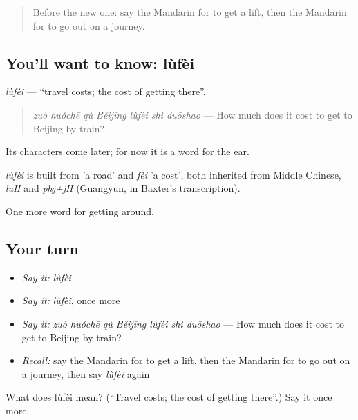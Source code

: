 \label{lesson:ZH-C429-lufei}



\begin{quote}
Before the new one: say the Mandarin for to get a lift, then the Mandarin for to go out on a journey.
\end{quote}

\subsection*{You'll want to know: lùfèi}
\emph{lùfèi} — \textquotedblleft{}travel costs; the cost of getting there\textquotedblright{}.

\begin{quote}
\emph{zuò huǒchē qù Běijīng lùfèi shì duōshao} — How much does it cost to get to Beijing by train?
\end{quote}

Its characters come later; for now it is a word for the ear.

\begin{cousinweb}
\emph{lùfèi} is built from  'a road' and \emph{fèi} 'a cost', both inherited from Middle Chinese, \emph{luH} and \emph{phj+jH} (Guangyun, in Baxter's transcription).
\end{cousinweb}

\begin{grammarlens}[title={What you've built}]
One more word for getting around.
\end{grammarlens}

\subsection*{Your turn}
\begin{itemize}
\raggedright
  \item \emph{Say it:} \emph{lùfèi}
  \item \emph{Say it:} \emph{lùfèi}, once more
  \item \emph{Say it:} \emph{zuò huǒchē qù Běijīng lùfèi shì duōshao} — How much does it cost to get to Beijing by train?
  \item \emph{Recall:} say the Mandarin for to get a lift, then the Mandarin for to go out on a journey, then say \emph{lùfèi} again
\end{itemize}

\begin{tcolorbox}[breakable,colback=teal!4,colframe=teal!35!black,title={Before you move on}]
What does lùfèi mean? (\textquotedblleft{}Travel costs; the cost of getting there\textquotedblright{}.) Say it once more.
\end{tcolorbox}
